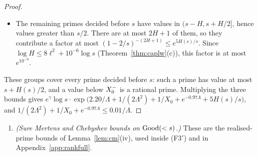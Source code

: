 \begin{proof}
\begin{itemize}
  $(\log s/\Lambda)\,e^{2.20/\Lambda+1/X_0+e^{-0.97\Lambda}}$.
\item The remaining primes decided before $s$ have values in $(s-H,s+H/2]$, hence values greater than $s/2$. There are at most
  $2H+1$ of them, so they contribute a factor at most $(1-2/s)^{-(2H+1)}\le e^{5H(s)/s}$. Since
  $\log H\le8\ell^2+10^{-6}\log s$ (Theorem~\ref{thm:caplw}(c)), this factor is at most $e^{10^{-9}}$.
\end{itemize}
These groups cover every prime decided before $s$: such a prime has value at most $s+H(s)/2$, and a value below $X_0^{-}$ is a
rational prime. Multiplying the three bounds gives
$e^{\gamma}\log s\cdot\exp\big(2.20/\Lambda+1/(2\Lambda^2)+1/X_0+e^{-0.97\Lambda}+5H(s)/s\big)$, and
$1/(2\Lambda^2)+1/X_0+e^{-0.97\Lambda}\le0.01/\Lambda$.
\end{proof}
\begin{enumerate}[label=\textup{(F4)},leftmargin=*]
\item\label{eq:sF4} \emph{(Sure Mertens and Chebyshev bounds on $\mathrm{Good}(<s)$.)} These are the realised-prime bounds of
  Lemma~\ref{lem:cm}(iv), used inside (F3$'$) and in Appendix~\ref{app:rankfull}.
\end{enumerate}

